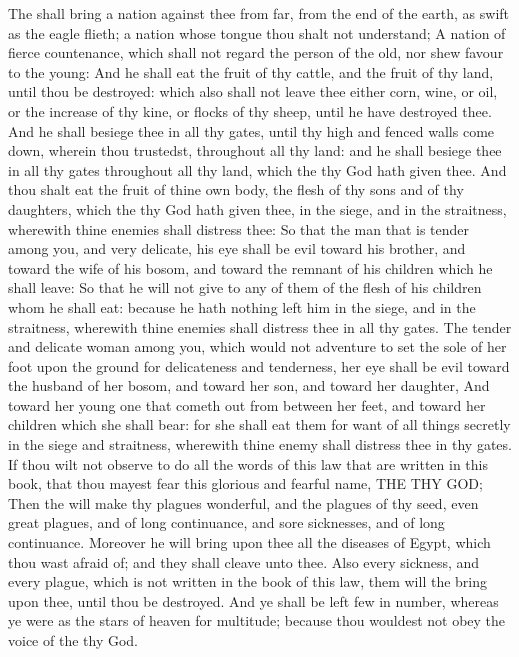 \begin{biblechapter}
\verse The \LORD shall bring a nation against thee from far, from the end of the earth, as swift as the eagle flieth; a nation whose tongue thou shalt not understand;
\verse A nation of fierce countenance, which shall not regard the person of the old, nor shew favour to the young:
\verse And he shall eat the fruit of thy cattle, and the fruit of thy land, until thou be destroyed: which also shall not leave thee either corn, wine, or oil, or the increase of thy kine, or flocks of thy sheep, until he have destroyed thee.
\verse And he shall besiege thee in all thy gates, until thy high and fenced walls come down, wherein thou trustedst, throughout all thy land: and he shall besiege thee in all thy gates throughout all thy land, which the \LORD thy God hath given thee.
\verse And thou shalt eat the fruit of thine own body, the flesh of thy sons and of thy daughters, which the \LORD thy God hath given thee, in the siege, and in the straitness, wherewith thine enemies shall distress thee:
\verse So that the man that is tender among you, and very delicate, his eye shall be evil toward his brother, and toward the wife of his bosom, and toward the remnant of his children which he shall leave:
\verse So that he will not give to any of them of the flesh of his children whom he shall eat: because he hath nothing left him in the siege, and in the straitness, wherewith thine enemies shall distress thee in all thy gates.
\verse The tender and delicate woman among you, which would not adventure to set the sole of her foot upon the ground for delicateness and tenderness, her eye shall be evil toward the husband of her bosom, and toward her son, and toward her daughter,
\verse And toward her young one that cometh out from between her feet, and toward her children which she shall bear: for she shall eat them for want of all things secretly in the siege and straitness, wherewith thine enemy shall distress thee in thy gates.
\verse If thou wilt not observe to do all the words of this law that are written in this book, that thou mayest fear this glorious and fearful name, THE \LORD THY GOD;
\verse Then the \LORD will make thy plagues wonderful, and the plagues of thy seed, even great plagues, and of long continuance, and sore sicknesses, and of long continuance.
\verse Moreover he will bring upon thee all the diseases of Egypt, which thou wast afraid of; and they shall cleave unto thee.
\verse Also every sickness, and every plague, which is not written in the book of this law, them will the \LORD bring upon thee, until thou be destroyed.
\verse And ye shall be left few in number, whereas ye were as the stars of heaven for multitude; because thou wouldest not obey the voice of the \LORD thy God.

\end{biblechapter}
